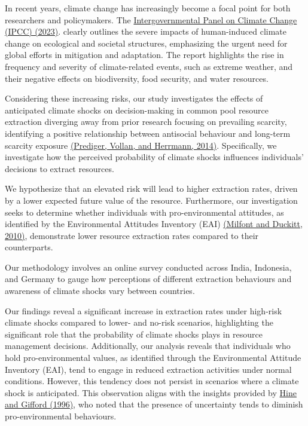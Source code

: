 \documentclass[11pt, a4paper, leqno]{article}
\begin{document}
In recent years, climate change has increasingly become a focal point for both researchers and policymakers. The \href{https://doi.org/10.59327/IPCC/AR6-9789291691647.001}{ Intergovernmental Panel on Climate Change (IPCC) (2023)}.
 clearly outlines the severe impacts of human-induced climate change on ecological and societal structures, emphasizing the urgent need for global efforts in mitigation and adaptation. The report highlights the rise in frequency and severity of climate-related events, such as extreme weather, and their negative effects on biodiversity, food security, and water resources.

Considering these increasing risks, our study investigates the effects of anticipated climate shocks on decision-making in common pool resource extraction diverging away from prior research focusing on prevailing scarcity, identifying a positive relationship between antisocial behaviour and long-term scarcity exposure  \href{https://doi.org/10.1016/j.jpubeco.2014.07.007}{(Prediger, Vollan, and Herrmann, 2014)}. Specifically, we investigate how the perceived probability of climate shocks influences individuals' decisions to extract resources. 


 We hypothesize that an elevated risk will lead to higher extraction rates, driven by a lower expected future value of the resource. Furthermore, our investigation seeks to determine whether individuals with pro-environmental attitudes, as identified by the Environmental Attitudes Inventory (EAI) \href{https://doi.org/10.1016/j.jenvp.2009.09.001}{(Milfont and Duckitt, 2010)}, demonstrate lower resource extraction rates compared to their counterparts.

Our methodology involves an online survey conducted across India, Indonesia, and Germany to gauge how perceptions of different extraction behaviours and awareness of climate shocks vary between countries.

Our findings reveal a significant increase in extraction rates under high-risk climate shocks compared to lower- and no-risk scenarios, highlighting the significant role that the probability of climate shocks plays in resource management decisions. Additionally, our analysis reveals that individuals who hold pro-environmental values, as identified through the Environmental Attitude Inventory (EAI), tend to engage in reduced extraction activities under normal conditions. However, this tendency does not persist in scenarios where a climate shock is anticipated. This observation aligns with the insights provided by \href{https://doi.org/10.1111/j.1559-1816.1996.tb01100.x}{ Hine and Gifford (1996)}, who noted that the presence of uncertainty tends to diminish pro-environmental behaviours. 
\end{document}
